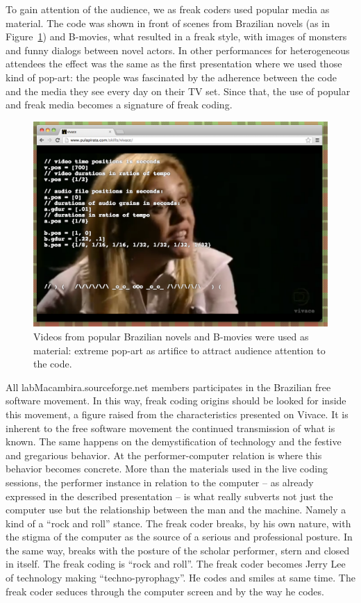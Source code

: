 \documentclass[letterpaper, 12pt]{article}
\begin{document}
To gain attention of the audience, we as freak coders used popular
media as material. The code was shown in front of scenes from
Brazilian novels (as in Figure~\ref{fig:novela}) and B-movies, what
resulted in a freak style, with images of monsters and funny dialogs
between novel actors. In other performances for heterogeneous
attendees the effect was the same as the first presentation where we
used those kind of pop-art: the people was fascinated by the adherence
between the code and the media they see every day on their TV
set. Since that, the use of popular and freak media becomes a
signature of freak coding.

\begin{figure}[htpb]
  \begin{center}
    \includegraphics[scale=.3]{img/fig_novela.png}
    \caption{Videos from popular Brazilian novels and B-movies were
      used as material: extreme pop-art as artifice to attract
      audience attention to the code.}
    \label{fig:novela}
  \end{center}
\end{figure}

All labMacambira.sourceforge.net members participates in the Brazilian
free software movement. In this way, freak coding origins should be
looked for inside this movement, a figure raised from the
characteristics presented on Vivace. It is inherent to the free
software movement the continued transmission of what is known. The
same happens on the demystification of technology and the festive and
gregarious behavior. At the performer-computer relation is where this
behavior becomes concrete. More than the materials used in the live
coding sessions, the performer instance in relation to the computer --
as already expressed in the described presentation -- is what really
subverts not just the computer use but the relationship between the
man and the machine. Namely a kind of a ``rock and roll'' stance. The
freak coder breaks, by his own nature, with the stigma of the computer
as the source of a serious and professional posture. In the same way,
breaks with the posture of the scholar performer, stern and closed in
itself. The freak coding is ``rock and roll''. The freak coder becomes
Jerry Lee of technology making ``techno-pyrophagy''. He codes and
smiles at same time. The freak coder seduces through the computer
screen and by the way he codes.
\end{document}
